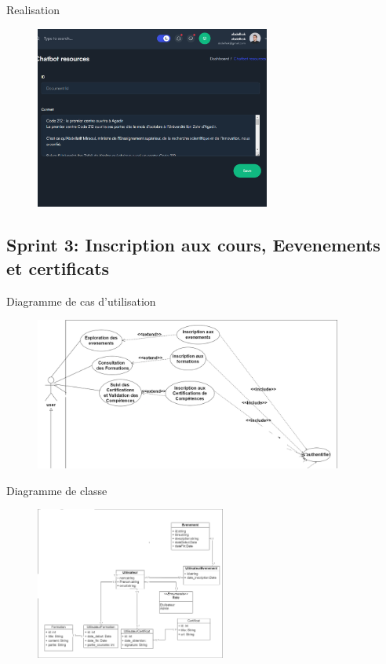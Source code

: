 \documentclass[aspectratio=169]{beamer}
\begin{document}
\begin{frame}{Realisation}
    \begin{figure}[htpb]
        \centering
        \includegraphics[height=6cm]{assets/images/admin-doc.png}
    \end{figure}
\end{frame}



\subsection{Sprint 3: Inscription aux cours, Eevenements et
    certificats}
\begin{frame}{Diagramme de cas d'utilisation}

    \begin{figure}[htpb]
        \centering
        \includegraphics[height=5cm]{assets/images/sprint3-usecase.png}
    \end{figure}
\end{frame}

\begin{frame}{Diagramme de classe}

    \begin{figure}[htpb]
        \centering
        \includegraphics[height=5cm]{assets/images/sprint2-class.png}
    \end{figure}
\end{frame}
\end{document}
